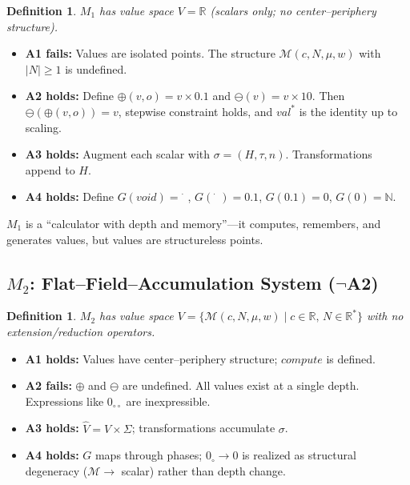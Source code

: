 \documentclass[11pt,a4paper]{article}
\newtheorem{definition}[theorem]{Definition}
\newcommand{\MDim}{\mathcal{M}}
\newcommand{\Sig}{\Sigma}
\newcommand{\Vhat}{\hat{V}}
\newcommand{\extop}{\oplus}
\newcommand{\redop}{\ominus}
\newcommand{\zext}{0_\circ}
\newcommand{\zextt}{0_{\circ\circ}}
\begin{document}
\begin{definition}
$M_1$ has value space $V = \mathbb{R}$ (scalars only; no center--periphery structure).
\end{definition}

\begin{itemize}[leftmargin=*]
  \item \textbf{A1 fails:} Values are isolated points. The structure $\MDim(c, N, \mu, w)$ with $|N| \geq 1$ is undefined.
  \item \textbf{A2 holds:} Define $\extop(v, o) = v \times 0.1$ and $\redop(v) = v \times 10$. Then $\redop(\extop(v, o)) = v$, stepwise constraint holds, and $\textit{val}^*$ is the identity up to scaling.
  \item \textbf{A3 holds:} Augment each scalar with $\sigma = (H, \tau, n)$. Transformations append to $H$.
  \item \textbf{A4 holds:} Define $G(\textit{void}) = \dot{\phantom{x}}$, $G(\dot{\phantom{x}}) = 0.1$, $G(0.1) = 0$, $G(0) = \mathbb{N}$.
\end{itemize}

$M_1$ is a ``calculator with depth and memory''---it computes, remembers, and generates values, but values are structureless points.

\subsection{$M_2$: Flat--Field--Accumulation System ($\neg$A2)}

\begin{definition}
$M_2$ has value space $V = \{\MDim(c, N, \mu, w) \mid c \in \mathbb{R},\, N \in \mathbb{R}^*\}$ with no extension/reduction operators.
\end{definition}

\begin{itemize}[leftmargin=*]
  \item \textbf{A1 holds:} Values have center--periphery structure; $\textit{compute}$ is defined.
  \item \textbf{A2 fails:} $\extop$ and $\redop$ are undefined. All values exist at a single depth. Expressions like $\zextt$ are inexpressible.
  \item \textbf{A3 holds:} $\Vhat = V \times \Sig$; transformations accumulate $\sigma$.
  \item \textbf{A4 holds:} $G$ maps through phases; $\zext \to 0$ is realized as structural degeneracy ($\MDim \to$ scalar) rather than depth change.
\end{itemize}
\end{document}
